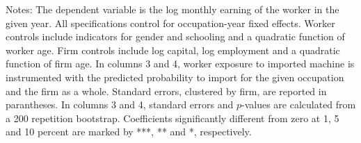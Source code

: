 \begin{tablenotes}
\item \footnotesize Notes: The dependent variable is the log monthly earning of the worker in the given year. All specifications control for occupation-year fixed effects. Worker controls include indicators for gender and schooling and a quadratic function of worker age. Firm controls include log capital, log employment and a quadratic function of firm age. In columns 3 and 4, worker exposure to imported machine is instrumented with the predicted probability to import for the given occupation and the firm as a whole. Standard errors, clustered by firm, are reported in parantheses. In columns 3 and 4, standard errors and $p$-values are calculated from a 200 repetition bootstrap. Coefficients significantly different from zero at 1, 5 and 10 percent are marked by ***, ** and *, respectively.

\end{tablenotes} 